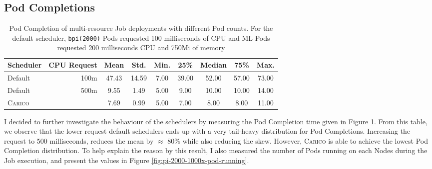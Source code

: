\subsection{Pod Completions}
\begin{table}[ht!]
\centering
    \begin{tabular}{|l|r|c|c|c|c|c|c|c|}
    \hline
        \bfseries Scheduler & \bfseries CPU Request & \bfseries Mean & \bfseries Std. &
        \bfseries Min. & \bfseries 25\% & \bfseries Median & \bfseries 75\% & \bfseries Max. \\
    \hline
        Default & 100m & 47.43 & 14.59 & 7.00 & 39.00 & 52.00 & 57.00 & 73.00
        \\
        Default & 500m & 9.55 & 1.49 & 5.00 & 9.00 & 10.00 & 10.00 & 14.00
        \\
        \textsc{Carico} & & 7.69 & 0.99 & 5.00 & 7.00 & 8.00 & 8.00 & 11.00 \\
    \hline
    \end{tabular}
    \caption{Pod Completion of multi-resource Job deployments with different Pod
    counts. For the default scheduler, \texttt{bpi(2000)} Pods requested 100
    milliseconds of CPU and ML Pods requested 200 milliseconds CPU and 750Mi of
    memory}
    \label{tab:cpu-pod-completions}
\end{table}
I decided to further investigate the behaviour of the schedulers by measuring
the Pod Completion time given in Figure \ref{tab:cpu-pod-completions}. From this
table, we observe that the lower request default schedulers ends up with a very
tail-heavy distribution for Pod Completions. Increasing the request to 500
milliseconds, reduces the mean by $\approx$ 80\% while also reducing the skew.
However, \textsc{Carico} is able to achieve the lowest Pod Completion distribution. To
help explain the reason by this result, I also measured the number of Pods
running on each Nodes during the Job execution, and present the values in Figure
\ref{fig:pi-2000-1000x-pod-running}.

